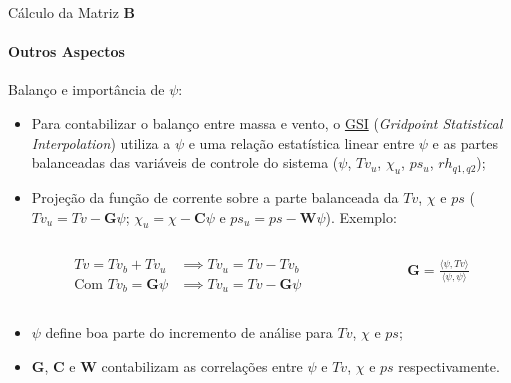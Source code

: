 \documentclass[10pt,aspectratio=169]{beamer}
\begin{document}
\begin{frame}[fragile]{Cálculo da Matriz $\mathbf{B}$}
\framesubtitle{Outros Aspectos}
  \begin{block}{Balanço e importância de $\psi$:}
    \begin{itemize}
	    \item Para contabilizar o balanço entre massa e vento, o \href{https://dtcenter.org/community-code/gridpoint-statistical-interpolation-gsi}{GSI} (\textit{Gridpoint Statistical Interpolation}) utiliza a $\psi$ e uma relação estatística linear entre $\psi$ e as partes balanceadas das variáveis de controle do sistema ($\psi$, $Tv_{u}$, $\chi_{u}$, $ps_{u}$, $rh_{q1,q2}$);
	    \pause
	    \item Projeção da função de corrente sobre a parte balanceada da $Tv$, $\chi$ e $ps$ ($Tv_{u} = Tv - \mathbf{G}\psi$; $\chi_{u} = \chi - \mathbf{C}\psi$ e $ps_{u} = ps - \mathbf{W}\psi$). Exemplo:
	    \begin{columns}
    	  \begin{column}{0.1\textwidth} 
			    \begin{align*}
				    Tv = Tv_{b} + Tv_{u} &\implies Tv_{u} = Tv - Tv_{b} \\
            \text{Com  } Tv_{b} = \mathbf{G}\psi &\implies Tv_{u} = Tv - \mathbf{G}\psi
			    \end{align*}
		    \end{column}
		    \begin{column}{0.1\textwidth} 
			    \begin{align*}
				    \mathbf{G} = \frac{\langle\psi, Tv\rangle}{\langle\psi, \psi\rangle}
			    \end{align*}
		    \end{column}
	    \end{columns}	
      \vspace{1em}
	    \pause
	    \item $\psi$ define boa parte do incremento de análise para $Tv$, $\chi$ e $ps$;
	    \pause
	    \item $\mathbf{G}$, $\mathbf{C}$ e $\mathbf{W}$ contabilizam as correlações entre $\psi$ e $Tv$, $\chi$ e $ps$ respectivamente.
	  \end{itemize}
  \end{block}
\end{frame}
\end{document}
